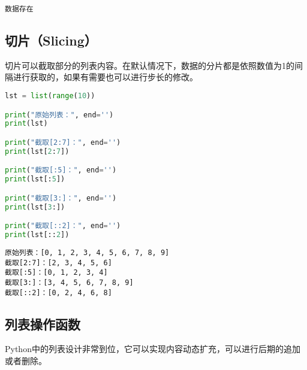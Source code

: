 \begin{tcolorbox}
	\begin{verbatim}
数据存在
\end{verbatim}
\end{tcolorbox}

\vspace{0.5cm}

\subsection{切片（Slicing）}

切片可以截取部分的列表内容。在默认情况下，数据的分片都是依照数值为1的间隔进行获取的，如果有需要也可以进行步长的修改。\\


\begin{lstlisting}[language=Python]
lst = list(range(10))

print("原始列表：", end='')
print(lst)

print("截取[2:7]：", end='')
print(lst[2:7])

print("截取[:5]：", end='')
print(lst[:5])

print("截取[3:]：", end='')
print(lst[3:])

print("截取[::2]：", end='')
print(lst[::2])
\end{lstlisting}

\begin{tcolorbox}
	\begin{verbatim}
原始列表：[0, 1, 2, 3, 4, 5, 6, 7, 8, 9]
截取[2:7]：[2, 3, 4, 5, 6]
截取[:5]：[0, 1, 2, 3, 4]
截取[3:]：[3, 4, 5, 6, 7, 8, 9]
截取[::2]：[0, 2, 4, 6, 8]
\end{verbatim}
\end{tcolorbox}

\vspace{0.5cm}

\subsection{列表操作函数}

Python中的列表设计非常到位，它可以实现内容动态扩充，可以进行后期的追加或者删除。

